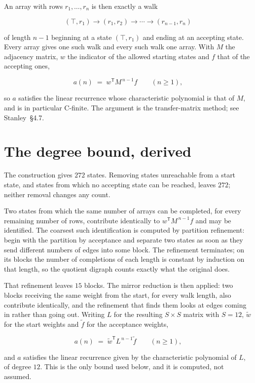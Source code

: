 \documentclass[11pt]{article}
\theoremstyle{definition}
\begin{document}
An array with rows $r_1,\dots,r_n$ is then exactly a walk

\[(\top,r_1) \to (r_1,r_2) \to \cdots \to (r_{n-1},r_n)\]

of length $n-1$ beginning at a state $(\top,r_1)$ and ending at an accepting state. Every array gives one such walk and every such walk one array. With $M$ the adjacency matrix, $w$ the indicator of the allowed starting states and $f$ that of the accepting ones,

\[a(n) \;=\; w^{\mathsf T} M^{\,n-1} f \qquad (n \ge 1),\]

so $a$ satisfies the linear recurrence whose characteristic polynomial is that of $M$, and is in particular C-finite. The argument is the transfer-matrix method; see Stanley~\S4.7.

\section{The degree bound, derived}

The construction gives $272$ states. Removing states unreachable from a start state, and states from which no accepting state can be reached, leaves $272$; neither removal changes any count.

Two states from which the same number of arrays can be completed, for every remaining number of rows, contribute identically to $w^{\mathsf T}M^{\,n-1}f$ and may be identified. The coarsest such identification is computed by partition refinement: begin with the partition by acceptance and separate two states as soon as they send different numbers of edges into some block. The refinement terminates; on its blocks the number of completions of each length is constant by induction on that length, so the quotient digraph counts exactly what the original does.

That refinement leaves $15$ blocks. The mirror reduction is then applied: two blocks receiving the same weight from the start, for every walk length, also contribute identically, and the refinement that finds them looks at edges coming in rather than going out. Writing $L$ for the resulting $S \times S$ matrix with $S = 12$, $\tilde w$ for the start weights and $\tilde f$ for the acceptance weights,

\[a(n) \;=\; \tilde w^{\mathsf T} L^{\,n-1} \tilde f \qquad (n \ge 1),\]

and $a$ satisfies the linear recurrence given by the characteristic polynomial of $L$, of degree $12$. This is the only bound used below, and it is computed, not assumed.
\end{document}
